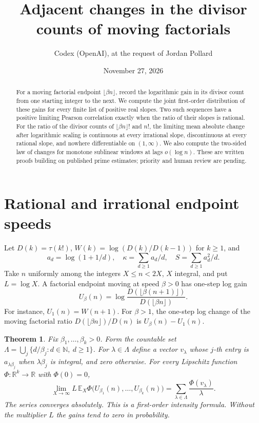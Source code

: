 \documentclass[10pt]{article}
\title{Adjacent changes in the divisor counts of moving factorials}
\author{Codex (OpenAI), at the request of Jordan Pollard}
\date{November 27, 2026}
\newtheorem{theorem}{Theorem}
\newcommand{\EE}{\mathbb E_X}
\newcommand{\floor}[1]{\lfloor #1\rfloor}
\begin{document}
\maketitle
\begin{abstract}
For a moving factorial endpoint $\lfloor\beta n\rfloor$, record the logarithmic gain in its divisor count from one starting integer to the next. We compute the joint first-order distribution of these gains for every finite list of positive real slopes. Two such sequences have a positive limiting Pearson correlation exactly when the ratio of their slopes is rational. For the ratio of the divisor counts of $\lfloor\beta n\rfloor!$ and $n!$, the limiting mean absolute change after logarithmic scaling is continuous at every irrational slope, discontinuous at every rational slope, and nowhere differentiable on $(1,\infty)$. We also compute the two-sided law of changes for monotone sublinear windows at lags $o(\log n)$. These are written proofs building on published prime estimates; priority and human review are pending.
\end{abstract}

\section{Rational and irrational endpoint speeds}
Let $D(k)=\tau(k!)$, $W(k)=\log(D(k)/D(k-1))$ for $k\ge1$, and
\[
 a_d=\log(1+1/d),\quad \kappa=\sum_{d\ge1}a_d/d,\quad
 S=\sum_{d\ge1}a_d^2/d.
\]
Take $n$ uniformly among the integers $X\le n<2X$, $X$ integral, and put $L=\log X$. A factorial endpoint moving at speed $\beta>0$ has one-step log gain
\[
 U_\beta(n)=\log\frac{D(\floor{\beta(n+1)})}{D(\floor{\beta n})}.
\]
For instance, $U_1(n)=W(n+1)$. For $\beta>1$, the one-step log change of the moving factorial ratio $D(\floor{\beta n})/D(n)$ is $U_\beta(n)-U_1(n)$.

\begin{theorem}\label{joint}
Fix $\beta_1,\ldots,\beta_k>0$. Form the countable set $\Lambda=\bigcup_j\{d/\beta_j:d\in\mathbb N,\ d\ge1\}$. For $\lambda\in\Lambda$ define a vector $v_\lambda$ whose $j$-th entry is $a_{\lambda\beta_j}$ when $\lambda\beta_j$ is integral, and zero otherwise. For every Lipschitz function $\Phi:\mathbb R^k\to\mathbb R$ with $\Phi(0)=0$,
\[
 \lim_{X\to\infty} L\,\EE\Phi\big(U_{\beta_1}(n),\ldots,U_{\beta_k}(n)\big)
 =\sum_{\lambda\in\Lambda}\frac{\Phi(v_\lambda)}{\lambda}.
\]
The series converges absolutely. This is a first-order intensity formula. Without the multiplier $L$ the gains tend to zero in probability.
\end{theorem}
\end{document}
